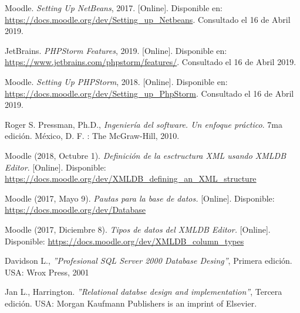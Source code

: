 \begin{thebibliography}{9}
        Moodle. {\it Setting Up NetBeans}, 2017. [Online]. Disponible en: \url{https://docs.moodle.org/dev/Setting_up_Netbeans}. Consultado el 16 de Abril 2019.

        JetBrains. {\it PHPStorm Features}, 2019. [Online]. Disponible en: \url{https://www.jetbrains.com/phpstorm/features/}. Consultado el 16 de Abril 2019.

        Moodle. {\it Setting Up PHPStorm}, 2018. [Online]. Disponible en: \url{https://docs.moodle.org/dev/Setting_up_PhpStorm}. Consultado el 16 de Abril 2019.

        Roger S. Pressman, Ph.D., \textit{Ingeniería del software. Un enfoque práctico}. 7ma edición. México, D. F. : The McGraw-Hill, 2010.

         Moodle  (2018, Octubre 1).\textit{ Definición de la esctructura XML usando XMLDB Editor}.  [Online]. Disponible: \url{ https://docs.moodle.org/dev/XMLDB_defining_an_XML_structure}


          Moodle (2017, Mayo 9). \textit{Pautas para la base de datos.} [Online]. Disponible: \url{https://docs.moodle.org/dev/Database}

        Moodle  (2017, Diciembre 8). \textit{Tipos de datos del XMLDB Editor.} [Online]. Disponible: \url{https://docs.moodle.org/dev/XMLDB_column_types}

        Davidson L., \textit{''Profesional SQL Server 2000 Database Desing''}, Primera edición. USA: Wrox Press, 2001

        Jan L., Harrington. \textit{''Relational databse design and implementation''}, Tercera edición. USA: Morgan Kaufmann Publishers is an imprint of Elsevier.


\end{thebibliography}
